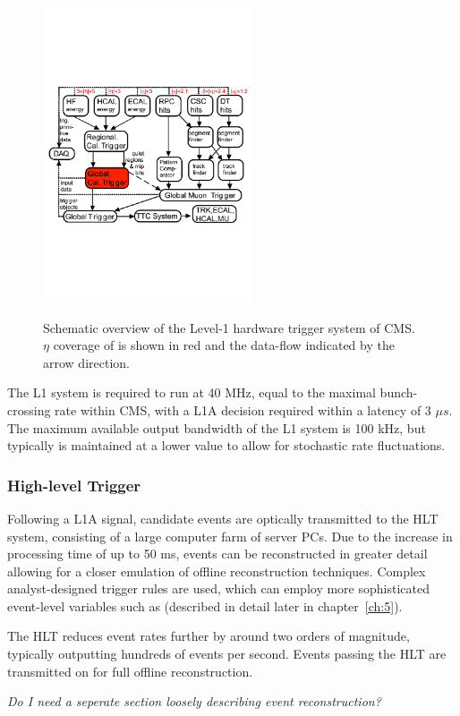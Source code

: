 \begin{figure}[ht!]
  \centering
  \includegraphics[width = 0.55\textwidth]{Figs/machine/L1_diagram.pdf}
  \label{fig:l1_diagram}
  \caption{Schematic overview of the Level-1 hardware trigger system of CMS. $
  \eta$ coverage of is shown in red and the data-flow indicated by the arrow 
  direction.}
\end{figure}

The L1 system is required to run at 40 MHz, equal to the maximal bunch-crossing
rate within CMS, with a L1A decision required within a latency of 3 $\mu s$. The
maximum available output bandwidth of the L1 system is 100 kHz, but typically is
maintained at a lower value to allow for stochastic rate fluctuations.

\subsubsection{High-level Trigger}

Following a L1A signal, candidate events are optically transmitted to the HLT 
system, consisting of a large computer farm of server 
PCs. Due to the increase in processing time of up to 50 ms, events can be
reconstructed in greater detail allowing for a closer emulation of offline 
reconstruction techniques. Complex analyst-designed trigger rules are used, 
which can employ more sophisticated event-level variables such as \alphat
(described in detail later in chapter~\ref{ch:5}).

The HLT reduces event rates further by around two orders of magnitude, typically
outputting hundreds of events per second. Events passing the HLT are transmitted
on for full offline reconstruction.

\emph{Do I need a seperate section loosely describing event reconstruction?}